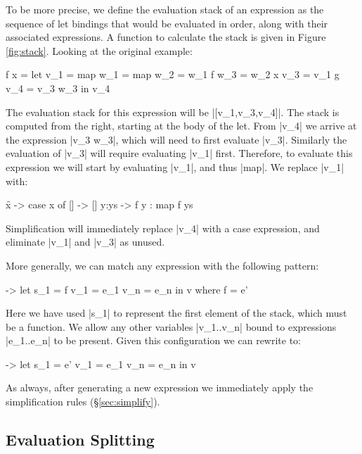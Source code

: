 \documentclass[draft]{sigplanconf}
\begin{document}
To be more precise, we define the evaluation stack of an expression as the sequence of let bindings that would be evaluated in order, along with their associated expressions. A function to calculate the stack is given in Figure \ref{fig:stack}. Looking at the original example:

\begin{code}
\g f x =  let  v_1  = map
               w_1  = map
               w_2  = w_1 f
               w_3  = w_2 x
               v_3  = v_1 g
               v_4  = v_3 w_3
          in   v_4
\end{code}

The evaluation stack for this expression will be |[v_1,v_3,v_4]|. The stack is computed from the right, starting at the body of the let. From |v_4| we arrive at the expression |v_3 w_3|, which will need to first evaluate |v_3|. Similarly the evaluation of |v_3| will require evaluating |v_1| first. Therefore, to evaluate this expression we will start by evaluating |v_1|, and thus |map|. We replace |v_1| with:

\begin{code}
\f x -> case  x of
              []    -> []
              y:ys  -> f y : map f ys
\end{code}

Simplification will immediately replace |v_4| with a case expression, and eliminate |v_1| and |v_3| as unused.

More generally, we can match any expression with the following pattern:

\begin{code}
\free ->  let  s_1  = f
               v_1  = e_1
               v_n  = e_n
          in   v
where f = e'
\end{code}

Here we have used |s_1| to represent the first element of the stack, which must be a function. We allow any other variables |v_1..v_n| bound to expressions |e_1..e_n| to be present. Given this configuration we can rewrite to:

\begin{code}
\free ->  let  s_1  = e'
               v_1  = e_1
               v_n  = e_n
          in   v
\end{code}

As always, after generating a new expression we immediately apply the simplification rules (\S\ref{sec:simplify}).

\subsection{Evaluation Splitting}
\label{sec:eval_split}
\end{document}
